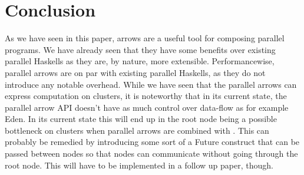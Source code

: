 \section{Conclusion}
As we have seen in this paper, arrows are a useful tool for composing parallel programs. We have already seen that they have some benefits over existing parallel Haskells as they are, by nature, more extensible. Performancewise, parallel arrows are on par with existing parallel Haskells, as they do not introduce any notable overhead. While we have seen that the parallel arrows can express computation on clusters, it is noteworthy that in its current state, the parallel arrow API doesn't have as much control over data-flow as for example Eden. In its current state this will end up in the root node being a possible bottleneck on clusters when parallel arrows are combined with \code{>>>}. This can probably be remedied by introducing some sort of a Future construct that can be passed between nodes so that nodes can communicate without going through the root node. This will have to be implemented in a follow up paper, though.